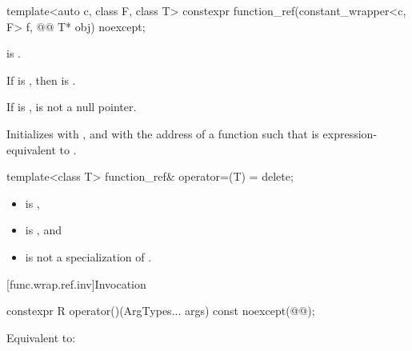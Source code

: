 \begin{itemdecl}
template<auto c, class F, class T>
  constexpr function_ref(constant_wrapper<c, F> f, @\cv{}@ T* obj) noexcept;
\end{itemdecl}

\begin{itemdescr}
\pnum
\constraints
{} is .

\pnum
\mandates
If  is , then  is .

\pnum
\expects
If  is ,  is not a null pointer.

\pnum
\effects
Initializes  with , and  with the address of a function  such that  is expression-equivalent to .
\end{itemdescr}

\begin{itemdecl}
template<class T> function_ref& operator=(T) = delete;
\end{itemdecl}

\begin{itemdescr}
\pnum
\constraints
\begin{itemize}
\item {} is ,
\item {} is , and
\item {} is not a specialization of .
\end{itemize}
\end{itemdescr}

[func.wrap.ref.inv]{Invocation}

\begin{itemdecl}
constexpr R operator()(ArgTypes... args) const noexcept(@@);
\end{itemdecl}

\begin{itemdescr}
\pnum
\effects
Equivalent to: 
\end{itemdescr}

